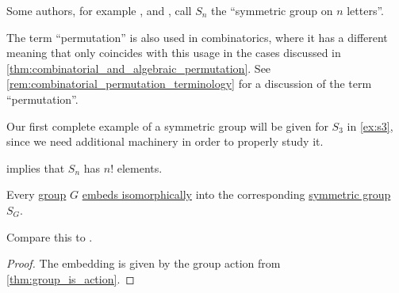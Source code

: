\begin{comments}
  \item Some authors, for example \textcite[253]{MacLane1998CategoryTheory}, \textcite[31]{Jacobson1985BasicAlgebraI} and \textcite[121]{Knapp2016BasicAlgebra}, call \( S_n \) the \enquote{symmetric group on \( n \) letters}.

  \item The term \enquote{permutation} is also used in combinatorics, where it has a different meaning that only coincides with this usage in the cases discussed in \cref{thm:combinatorial_and_algebraic_permutation}. See \cref{rem:combinatorial_permutation_terminology} for a discussion of the term \enquote{permutation}.

  \item Our first complete example of a symmetric group will be given for \( S_3 \) in \cref{ex:s3}, since we need additional machinery in order to properly study it.

  \item {} implies that \( S_n \) has \( n! \) elements.
\end{comments}

\begin{theorem}\label{thm:cayleys_theorem}
  Every \hyperref[def:group]{group} \( G \) \hyperref[def:fol_embedding]{embeds isomorphically} into the corresponding \hyperref[def:symmetric_group]{symmetric group} \( S_G \).
\end{theorem}
\begin{comments}
  \item Compare this to .
\end{comments}
\begin{proof}
  The embedding is given by the group action from \cref{thm:group_is_action}.
\end{proof}

